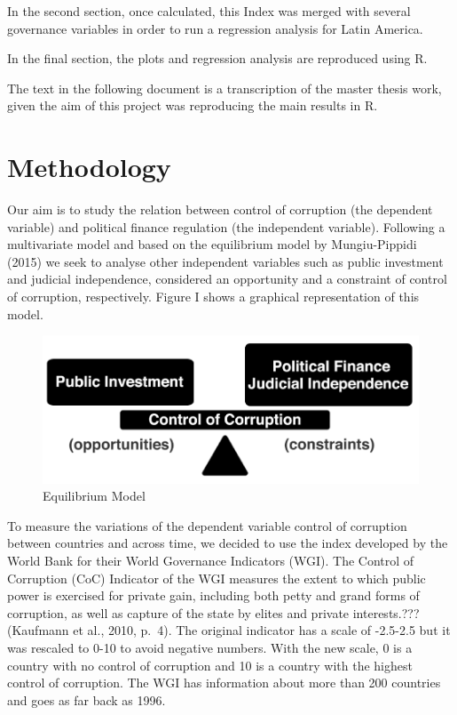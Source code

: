 \documentclass[12,twoside]{article}
\begin{document}
In the second section, once calculated, this Index was merged with
several governance variables in order to run a regression analysis for
Latin America.

In the final section, the plots and regression analysis are reproduced
using R.

The text in the following document is a transcription of the master
thesis work, given the aim of this project was reproducing the main
results in R.

\newpage

\thispagestyle{empty} \tableofcontents
\clearpage
\pagebreak


\section{Methodology}\label{method}

Our aim is to study the relation between control of corruption (the
dependent variable) and political finance regulation (the independent
variable). Following a multivariate model and based on the equilibrium
model by Mungiu-Pippidi (2015) we seek to analyse other independent
variables such as public investment and judicial independence,
considered an opportunity and a constraint of control of corruption,
respectively. Figure I shows a graphical representation of this model.

\begin{figure}[htbp]
\centering
\includegraphics{figure_i.png}
\caption{Equilibrium Model}
\end{figure}

To measure the variations of the dependent variable control of
corruption between countries and across time, we decided to use the
index developed by the World Bank for their World Governance Indicators
(WGI). The Control of Corruption (CoC) Indicator of the WGI measures the
extent to which public power is exercised for private gain, including
both petty and grand forms of corruption, as well as capture of the
state by elites and private interests.??? (Kaufmann et al., 2010, p.~4).
The original indicator has a scale of -2.5-2.5 but it was rescaled to
0-10 to avoid negative numbers. With the new scale, 0 is a country with
no control of corruption and 10 is a country with the highest control of
corruption. The WGI has information about more than 200 countries and
goes as far back as 1996.
\end{document}
